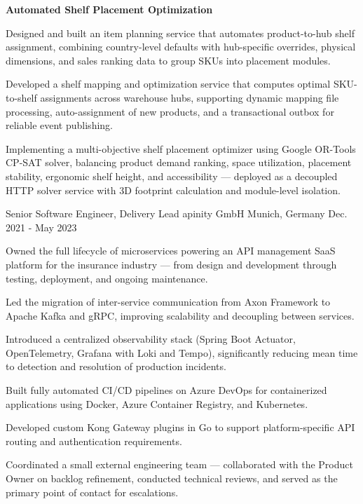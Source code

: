 \begin{cventries}
{\begin{cvitems}
        \item[] {\textbf{Automated Shelf Placement Optimization}}
        \item {Designed and built an item planning service that automates product-to-hub shelf assignment, combining country-level defaults with hub-specific overrides, physical dimensions, and sales ranking data to group SKUs into placement modules.}
        \item {Developed a shelf mapping and optimization service that computes optimal SKU-to-shelf assignments across warehouse hubs, supporting dynamic mapping file processing, auto-assignment of new products, and a transactional outbox for reliable event publishing.}
        \item {Implementing a multi-objective shelf placement optimizer using Google OR-Tools CP-SAT solver, balancing product demand ranking, space utilization, placement stability, ergonomic shelf height, and accessibility --- deployed as a decoupled HTTP solver service with 3D footprint calculation and module-level isolation.}
      \end{cvitems}
    }

  \cventry
    {Senior Software Engineer, Delivery Lead} %
    {apinity GmbH} %
    {Munich, Germany} %
    {Dec. 2021 - May 2023} %
    {
      \begin{cvitems} %
        \item {Owned the full lifecycle of microservices powering an API management SaaS platform for the insurance industry --- from design and development through testing, deployment, and ongoing maintenance.}
        \item {Led the migration of inter-service communication from Axon Framework to Apache Kafka and gRPC, improving scalability and decoupling between services.}
        \item {Introduced a centralized observability stack (Spring Boot Actuator, OpenTelemetry, Grafana with Loki and Tempo), significantly reducing mean time to detection and resolution of production incidents.}
        \item {Built fully automated CI/CD pipelines on Azure DevOps for containerized applications using Docker, Azure Container Registry, and Kubernetes.}
        \item {Developed custom Kong Gateway plugins in Go to support platform-specific API routing and authentication requirements.}
        \item {Coordinated a small external engineering team --- collaborated with the Product Owner on backlog refinement, conducted technical reviews, and served as the primary point of contact for escalations.}
      \end{cvitems}
    }


\end{cventries}
